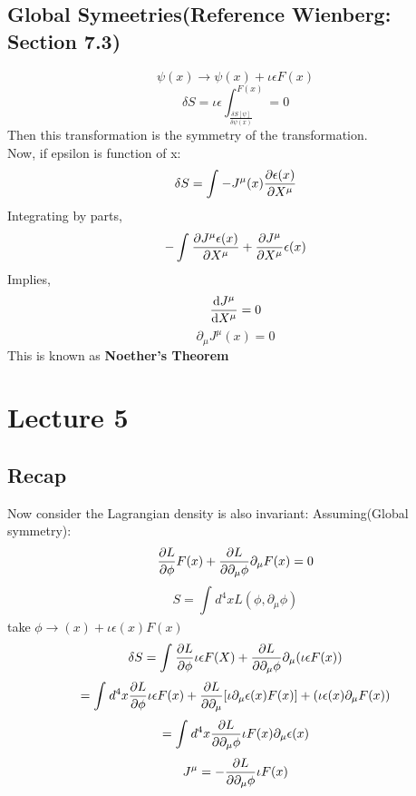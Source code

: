 \documentclass{scrartcl}
\begin{document}
\subsection{Global Symeetries(Reference Wienberg: Section 7.3)}
\[ \psi(x) \rightarrow \psi(x) + \iota \epsilon F(x)\]
\[ \delta S = \iota \epsilon \displaystyle\int_{\displaystyle\frac{\delta S[\psi]}{\delta \psi(x)}}^{F(x)} = 0 \]
Then this transformation is the symmetry of the transformation.\\
Now, if epsilon is function of x:
\[ \delta S = \displaystyle\int_{}^{} -J^\mu(x) \pdv{\epsilon(x)}{X^\mu}  \]
Integrating by parts,
\[ - \displaystyle\int_{}^{} \pdv{J^\mu \epsilon(x)}{X^\mu} + \pdv{J^\mu}{X^\mu} \epsilon(x) \]
Implies,
\[ \dv{J^\mu}{X^\mu} = 0 \]
\[ \partial_\mu J^\mu(x) = 0 \]
This is known as \textbf{Noether's Theorem}
\section{Lecture 5}
\subsection{Recap}
Now consider the Lagrangian density is also invariant:
Assuming(Global symmetry):
\[ \pdv{L}{\phi} F(x) + \pdv{L}{\partial_\mu \phi} \partial_\mu F(x) = 0 \]
\[ S = \displaystyle\int_{}^{} d^4 x L(\phi, \partial_\mu \phi) \]
take \( \phi \rightarrow(x) + \iota \epsilon(x) F(x) \)
\[ \delta S = \displaystyle\int_{}^{} \pdv{L}{\phi} \iota \epsilon F(X) + \pdv{L}{\partial_\mu \phi} \partial_\mu ( \iota \epsilon F(x)) \]
\[ = \displaystyle\int_{}^{} d^4 x \pdv{L}{\phi} \iota \epsilon F(x) 
+ \pdv{L}{\partial_\mu}  [ \iota \partial_\mu \epsilon(x) F(x) ] 
+ (\iota \epsilon(x) \partial_\mu F(x)) \]
\[ = \displaystyle\int_{}^{} d^4 x \pdv{L}{\partial_\mu \phi} \iota  F(x) \partial_\mu \epsilon(x)  \]
\[ J^\mu = - \pdv{L}{\partial_\mu \phi} \iota F(x) \]
\end{document}
